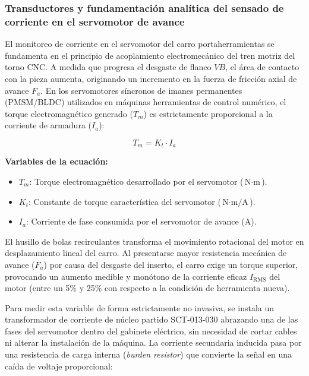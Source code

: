 \subsubsection{Transductores y fundamentación analítica del sensado de corriente en el servomotor de avance}

El monitoreo de corriente en el servomotor del carro portaherramientas se fundamenta en el principio de acoplamiento electromecánico del tren motriz del torno CNC. A medida que progresa el desgaste de flanco $VB$, el área de contacto con la pieza aumenta, originando un incremento en la fuerza de fricción axial de avance $F_a$. En los servomotores síncronos de imanes permanentes (PMSM/BLDC) utilizados en máquinas herramientas de control numérico, el torque electromagnético generado ($T_m$) es estrictamente proporcional a la corriente de armadura ($I_a$):

\begin{equation}
T_m = K_t \cdot I_a
\label{eq:par_motor}
\end{equation}

\noindent\textbf{Variables de la ecuación:}
\begin{itemize}
    \item $T_m$: Torque electromagnético desarrollado por el servomotor ($\text{N}\cdot\text{m}$).
    \item $K_t$: Constante de torque característica del servomotor ($\text{N}\cdot\text{m/A}$).
    \item $I_a$: Corriente de fase consumida por el servomotor de avance ($\text{A}$).
\end{itemize}

El husillo de bolas recirculantes transforma el movimiento rotacional del motor en desplazamiento lineal del carro. Al presentarse mayor resistencia mecánica de avance ($F_a$) por causa del desgaste del inserto, el carro exige un torque superior, provocando un aumento medible y monótono de la corriente eficaz $I_{\text{RMS}}$ del motor (entre un 5\% y 25\% con respecto a la condición de herramienta nueva).

Para medir esta variable de forma estrictamente no invasiva, se instala un transformador de corriente de núcleo partido SCT-013-030 abrazando una de las fases del servomotor dentro del gabinete eléctrico, sin necesidad de cortar cables ni alterar la instalación de la máquina. La corriente secundaria inducida pasa por una resistencia de carga interna (\textit{burden resistor}) que convierte la señal en una caída de voltaje proporcional:


